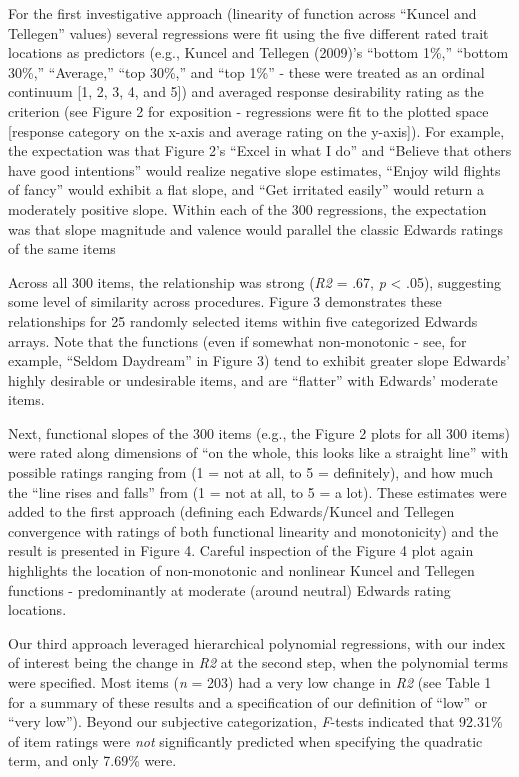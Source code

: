 \documentclass[
  english,
  ,jou]{apa6}
\begin{document}
For the first investigative approach (linearity of function across ``Kuncel and Tellegen'' values) several regressions were fit using the five different rated trait locations as predictors (e.g., Kuncel and Tellegen (2009)'s ``bottom 1\%,'' ``bottom 30\%,'' ``Average,'' ``top 30\%,'' and ``top 1\%'' - these were treated as an ordinal continuum {[}1, 2, 3, 4, and 5{]}) and averaged response desirability rating as the criterion (see Figure 2 for exposition - regressions were fit to the plotted space {[}response category on the x-axis and average rating on the y-axis{]}). For example, the expectation was that Figure 2's ``Excel in what I do'' and ``Believe that others have good intentions'' would realize negative slope estimates, ``Enjoy wild flights of fancy'' would exhibit a flat slope, and ``Get irritated easily'' would return a moderately positive slope. Within each of the 300 regressions, the expectation was that slope magnitude and valence would parallel the classic Edwards ratings of the same items

Across all 300 items, the relationship was strong (\emph{R2} = .67, \emph{p} \textless{} .05), suggesting some level of similarity across procedures. Figure 3 demonstrates these relationships for 25 randomly selected items within five categorized Edwards arrays. Note that the functions (even if somewhat non-monotonic - see, for example, ``Seldom Daydream'' in Figure 3) tend to exhibit greater slope Edwards' highly desirable or undesirable items, and are ``flatter'' with Edwards' moderate items.

Next, functional slopes of the 300 items (e.g., the Figure 2 plots for all 300 items) were rated along dimensions of ``on the whole, this looks like a straight line'' with possible ratings ranging from (1 = not at all, to 5 = definitely), and how much the ``line rises and falls'' from (1 = not at all, to 5 = a lot). These estimates were added to the first approach (defining each Edwards/Kuncel and Tellegen convergence with ratings of both functional linearity and monotonicity) and the result is presented in Figure 4. Careful inspection of the Figure 4 plot again highlights the location of non-monotonic and nonlinear Kuncel and Tellegen functions - predominantly at moderate (around neutral) Edwards rating locations.

Our third approach leveraged hierarchical polynomial regressions, with our index of interest being the change in \emph{R2} at the second step, when the polynomial terms were specified. Most items (\emph{n} = 203) had a very low change in \emph{R2} (see Table 1 for a summary of these results and a specification of our definition of ``low'' or ``very low''). Beyond our subjective categorization, \emph{F}-tests indicated that 92.31\% of item ratings were \emph{not} significantly predicted when specifying the quadratic term, and only 7.69\% were.
\end{document}
